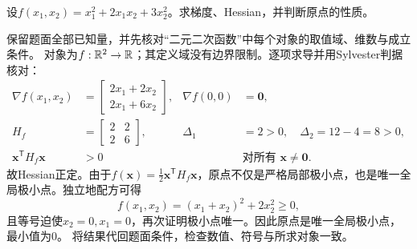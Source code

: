 \begin{example}[二元二次函数]\label{exm:V1-C03-quadratic}\label{schema:V1-C03:CH-18}\label{schema:V1-C03:CH-32}
\normalfont\unboldmath
设$f(x_1,x_2)=x_1^2+2x_1x_2+3x_2^2$。求梯度、Hessian，并判断原点的性质。
\end{example}
\label{schema:V1-C03:CH-33}
\begin{solution}
\SolGiven 保留题面全部已知量，并先核对“二元二次函数”中每个对象的取值域、维数与成立条件。
\SolDerive
对象为$f:\mathbb{R}^2\to\mathbb{R}$；其定义域没有边界限制。逐项求导并用Sylvester判据核对：
\[
\begin{aligned}
\nabla f(x_1,x_2)
&=\begin{bmatrix}2x_1+2x_2\\2x_1+6x_2\end{bmatrix},
&\nabla f(0,0)&=\boldsymbol0,\\
H_f&=\begin{bmatrix}2&2\\2&6\end{bmatrix},
&\Delta_1&=2>0,\quad \Delta_2=12-4=8>0,\\
\boldsymbol x^{\mathsf T}H_f\boldsymbol x&>0
& &\text{对所有 }\boldsymbol x\ne\boldsymbol0.
\end{aligned}
\]
故Hessian正定。由于$f(\boldsymbol x)=\tfrac12\boldsymbol x^{\mathsf T}H_f\boldsymbol x$，原点不仅是严格局部极小点，也是唯一全局极小点。独立地配方可得
\[
f(x_1,x_2)=(x_1+x_2)^2+2x_2^2\ge0,
\]
且等号迫使$x_2=0,x_1=0$，再次证明极小点唯一。因此原点是唯一全局极小点，最小值为$0$。
\SolCheck 将结果代回题面条件，检查数值、符号与所求对象一致。
\end{solution}

